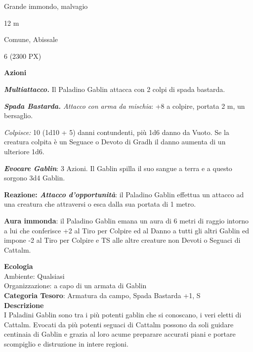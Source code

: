 \begin{multicols}{2}
{
\begin{description}[noitemsep, topsep=0pt, parsep=0pt, partopsep=0pt, itemsep=1pt, leftmargin=2.35cm,  labelwidth=2.2cm, itemindent=0cm, listparindent=0pt] %
\setlength{\baselineskip}{10pt}
\item[\textbf{Taglia/Tipo}] Grande immondo, malvagio
\item[\textbf{Caratt.}] 
\item[\textbf{Punti Ferita}] 
\item[\textbf{Movimento}] 12 m
\item[\textbf{Tiri Salvez.}] 
\item[\textbf{Sensi}] 
\item[\textbf{Linguaggi}] Comune, Abissale
\item[\textbf{Sfida}] 6 (2300 PX)
\end{description}
\smallskip

\textbf{Azioni}

\emph{\textbf{Multiattacco.}} Il Paladino Gablin attacca con 2 colpi di spada bastarda.

\emph{\textbf{Spada Bastarda.} Attacco con arma da mischia}: +8 a colpire, portata 2 m, un bersaglio.

\emph{Colpisce:} 10 (1d10 + 5) danni contundenti, più 1d6 danno da Vuoto. Se la creatura colpita è un Seguace o Devoto di Gradh il danno aumenta di un ulteriore 1d6.

\emph{\textbf{Evocare Gablin}}: 3 Azioni. Il Gablin spilla il suo sangue a terra e a questo sorgono 3d4 Gablin.

\textbf{Reazione: \emph{Attacco d'opportunità}}: il Paladino Gablin effettua un attacco ad una creatura che attraversi o esca dalla sua portata di 1 metro.

\textbf{Aura immonda}: il Paladino Gablin emana un aura di 6 metri di raggio intorno a lui che conferisce +2 al Tiro per Colpire ed al Danno a tutti gli altri Gablin ed impone -2 al Tiro per Colpire e TS alle altre creature non Devoti o Seguaci di Cattalm.

\textbf{Ecologia}\\
Ambiente: Qualsiasi\\
Organizzazione: a capo di un armata di Gablin\\
\textbf{Categoria Tesoro}: Armatura da campo, Spada Bastarda +1, S\\
\textbf{Descrizione}\\
I Paladini Gablin sono tra i più potenti gablin che si conoscano, i veri eletti di Cattalm. Evocati da più potenti seguaci di Cattalm possono da soli guidare centinaia di Gablin e grazia al loro acume preparare accurati piani e portare scompiglio e distruzione in intere regioni.

}
\end{multicols}
